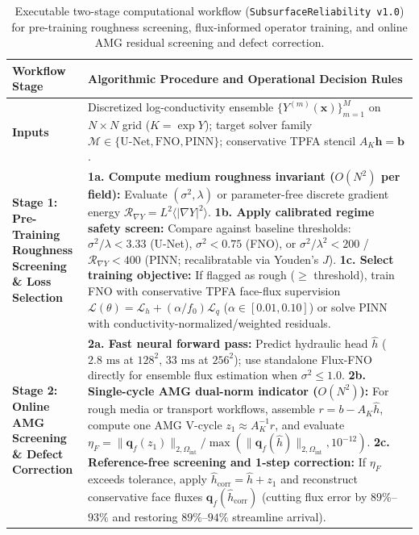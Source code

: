 \documentclass[preprint,12pt,authoryear]{elsarticle}
\begin{document}
\begin{table}[t!]
\centering
\caption{Executable two-stage computational workflow (\texttt{SubsurfaceReliability v1.0}) for pre-training roughness screening, flux-informed operator training, and online AMG residual screening and defect correction.}
\label{tab:algorithm_workflow}
\footnotesize
\begin{tabular}{p{3.2cm}p{12.4cm}}
\toprule
\textbf{Workflow Stage} & \textbf{Algorithmic Procedure and Operational Decision Rules} \\
\midrule
\textbf{Inputs} & Discretized log-conductivity ensemble $\{Y^{(m)}(\mathbf{x})\}_{m=1}^M$ on $N \times N$ grid ($K = \exp Y$); target solver family $\mathcal{M} \in \{\text{U-Net}, \text{FNO}, \text{PINN}\}$; conservative TPFA stencil $A_K \mathbf{h} = \mathbf{b}$. \\
\midrule
\textbf{Stage 1: Pre-Training Roughness Screening \& Loss Selection} & \textbf{1a. Compute medium roughness invariant ($O(N^2)$ per field):} Evaluate $(\sigma^2, \lambda)$ or parameter-free discrete gradient energy $\mathcal{R}_{\nabla Y} = L^2 \langle |\nabla Y|^2 \rangle$. \newline \textbf{1b. Apply calibrated regime safety screen:} Compare against baseline thresholds: $\sigma^2/\lambda < 3.33$ (U-Net), $\sigma^2 < 0.75$ (FNO), or $\sigma^2/\lambda^2 < 200$ / $\mathcal{R}_{\nabla Y} < 400$ (PINN; recalibratable via Youden's $J$). \newline \textbf{1c. Select training objective:} If flagged as rough ($\ge$ threshold), train FNO with conservative TPFA face-flux supervision $\mathcal{L}(\theta) = \mathcal{L}_h + (\alpha / f_0)\mathcal{L}_q$ ($\alpha \in [0.01, 0.10]$) or solve PINN with conductivity-normalized/weighted residuals. \\
\midrule
\textbf{Stage 2: Online AMG Screening \& Defect Correction} & \textbf{2a. Fast neural forward pass:} Predict hydraulic head $\hat{h}$ ($2.8\text{ ms}$ at $128^2$, $33\text{ ms}$ at $256^2$); use standalone Flux-FNO directly for ensemble flux estimation when $\sigma^2 \le 1.0$. \newline \textbf{2b. Single-cycle AMG dual-norm indicator ($O(N^2)$):} For rough media or transport workflows, assemble $r = b - A_K \hat{h}$, compute one AMG V-cycle $z_1 \approx A_K^{-1} r$, and evaluate $\eta_F = \|\mathbf{q}_f(z_1)\|_{2,\Omega_{\text{int}}} / \max(\|\mathbf{q}_f(\hat{h})\|_{2,\Omega_{\text{int}}}, 10^{-12})$. \newline \textbf{2c. Reference-free screening and 1-step correction:} If $\eta_F$ exceeds tolerance, apply $\hat{h}_{\text{corr}} = \hat{h} + z_1$ and reconstruct conservative face fluxes $\mathbf{q}_f(\hat{h}_{\text{corr}})$ (cutting flux error by $89\%$--$93\%$ and restoring $89\%$--$94\%$ streamline arrival). \\
\bottomrule
\end{tabular}
\end{table}
\end{document}
